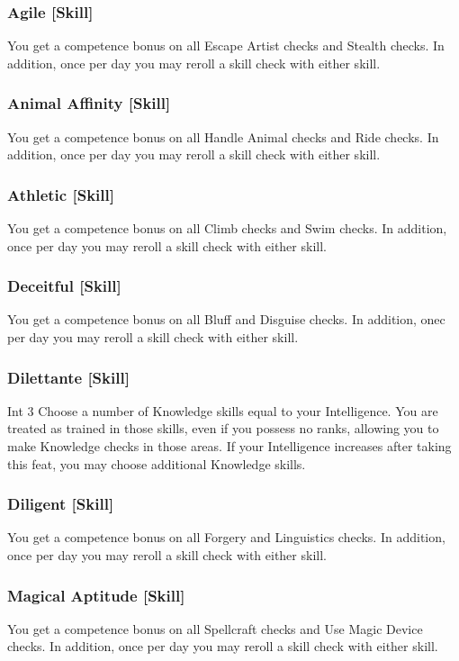 \subsubsection{Agile [Skill]}
 You get a  competence bonus on all Escape Artist checks and Stealth checks. In addition, once per day you may reroll a skill check with either skill.

\subsubsection{Animal Affinity [Skill]}
 You get a  competence bonus on all Handle Animal checks and Ride checks. In addition, once per day you may reroll a skill check with either skill.

\subsubsection{Athletic [Skill]}
 You get a  competence bonus on all Climb checks and Swim checks. In addition, once per day you may reroll a skill check with either skill.

\subsubsection{Deceitful [Skill]}
 You get a  competence bonus on all Bluff and Disguise checks. In addition, onec per day you may reroll a skill check with either skill.

\subsubsection{Dilettante [Skill]}
 Int 3
 Choose a number of Knowledge skills equal to your Intelligence. You are treated as trained in those skills, even if you possess no ranks, allowing you to make Knowledge checks in those areas. If your Intelligence increases after taking this feat, you may choose additional Knowledge skills.

\subsubsection{Diligent [Skill]}
 You get a  competence bonus on all Forgery and Linguistics checks. In addition, once per day you may reroll a skill check with either skill.

\subsubsection{Magical Aptitude [Skill]}
 You get a  competence bonus on all Spellcraft checks and Use Magic Device checks. In addition, once per day you may reroll a skill check with either skill.

